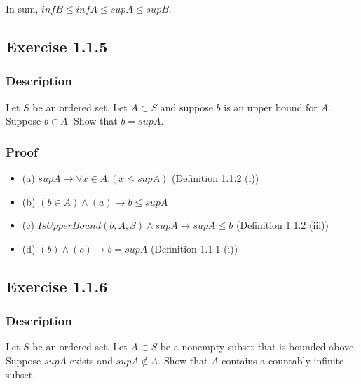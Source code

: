 \documentclass[12pt, letterpaper, oneside]{book}
\begin{document}
In sum, $inf B \le inf A \le sup A \le sup B$.

\subsection{Exercise 1.1.5}

\subsubsection{Description}

Let $S$ be an ordered set. Let $A \subset S$ and suppose $b$ is an upper bound for $A$. Suppose $b \in A$. Show that
$b = sup A$.

\subsubsection{Proof}

\begin{itemize}
  \item (a) $sup A \rightarrow \forall x \in A. (x \le sup A)$ (Definition 1.1.2 (i))
  \item (b) $(b \in A) \land (a) \rightarrow b \le sup A$
  \item (c) $IsUpperBound(b, A, S) \land sup A \rightarrow sup A \le b$ (Definition 1.1.2 (iii))
  \item (d) $(b) \land (c) \rightarrow b = sup A$ (Definition 1.1.1 (i))
\end{itemize}

\subsection{Exercise 1.1.6}

\subsubsection{Description}

Let $S$ be an ordered set. Let $A \subset S$ be a nonempty subset that is bounded above. Suppose $sup A$ exists and
$sup A \notin A$. Show that $A$ contains a countably infinite subset.

\end{document}

